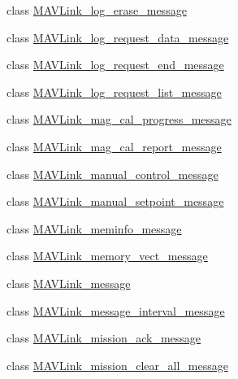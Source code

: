 \begin{DoxyCompactItemize}
\item 
class \hyperlink{classpymavlink_1_1dialects_1_1v10_1_1MAVLink__log__erase__message}{M\+A\+V\+Link\+\_\+log\+\_\+erase\+\_\+message}
\item 
class \hyperlink{classpymavlink_1_1dialects_1_1v10_1_1MAVLink__log__request__data__message}{M\+A\+V\+Link\+\_\+log\+\_\+request\+\_\+data\+\_\+message}
\item 
class \hyperlink{classpymavlink_1_1dialects_1_1v10_1_1MAVLink__log__request__end__message}{M\+A\+V\+Link\+\_\+log\+\_\+request\+\_\+end\+\_\+message}
\item 
class \hyperlink{classpymavlink_1_1dialects_1_1v10_1_1MAVLink__log__request__list__message}{M\+A\+V\+Link\+\_\+log\+\_\+request\+\_\+list\+\_\+message}
\item 
class \hyperlink{classpymavlink_1_1dialects_1_1v10_1_1MAVLink__mag__cal__progress__message}{M\+A\+V\+Link\+\_\+mag\+\_\+cal\+\_\+progress\+\_\+message}
\item 
class \hyperlink{classpymavlink_1_1dialects_1_1v10_1_1MAVLink__mag__cal__report__message}{M\+A\+V\+Link\+\_\+mag\+\_\+cal\+\_\+report\+\_\+message}
\item 
class \hyperlink{classpymavlink_1_1dialects_1_1v10_1_1MAVLink__manual__control__message}{M\+A\+V\+Link\+\_\+manual\+\_\+control\+\_\+message}
\item 
class \hyperlink{classpymavlink_1_1dialects_1_1v10_1_1MAVLink__manual__setpoint__message}{M\+A\+V\+Link\+\_\+manual\+\_\+setpoint\+\_\+message}
\item 
class \hyperlink{classpymavlink_1_1dialects_1_1v10_1_1MAVLink__meminfo__message}{M\+A\+V\+Link\+\_\+meminfo\+\_\+message}
\item 
class \hyperlink{classpymavlink_1_1dialects_1_1v10_1_1MAVLink__memory__vect__message}{M\+A\+V\+Link\+\_\+memory\+\_\+vect\+\_\+message}
\item 
class \hyperlink{classpymavlink_1_1dialects_1_1v10_1_1MAVLink__message}{M\+A\+V\+Link\+\_\+message}
\item 
class \hyperlink{classpymavlink_1_1dialects_1_1v10_1_1MAVLink__message__interval__message}{M\+A\+V\+Link\+\_\+message\+\_\+interval\+\_\+message}
\item 
class \hyperlink{classpymavlink_1_1dialects_1_1v10_1_1MAVLink__mission__ack__message}{M\+A\+V\+Link\+\_\+mission\+\_\+ack\+\_\+message}
\item 
class \hyperlink{classpymavlink_1_1dialects_1_1v10_1_1MAVLink__mission__clear__all__message}{M\+A\+V\+Link\+\_\+mission\+\_\+clear\+\_\+all\+\_\+message}

\end{DoxyCompactItemize}

